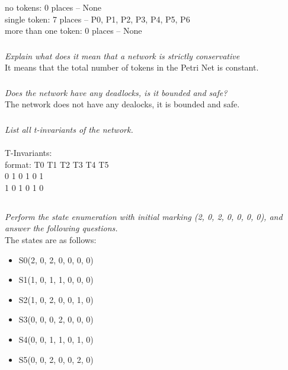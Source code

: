 \documentclass[letterpaper]{article}
\begin{document}
no tokens: 0 places -- None\\
single token: 7 places -- P0, P1, P2, P3, P4, P5, P6\\
more than one token: 0 places -- None\\

\subsubsection{}
\textit{Explain what does it mean that a network is strictly conservative}\\

It means that the total number of tokens in the Petri Net is constant.

\subsubsection{}
\textit{Does the network have any deadlocks, is it bounded and safe?}\\

The network does not have any dealocks, it is bounded and safe.

\subsubsection{}
\textit{List all t-invariants of the network.}\\ \\
T-Invariants: \\
format: T0 T1 T2 T3 T4 T5 \\
0 1 0 1 0 1 \\
1 0 1 0 1 0 \\

\subsection{}
\textit{Perform the state enumeration with initial marking (2, 0, 2, 0, 0, 0, 0), and answer the following questions.}\\

The states are as follows:
\begin{itemize}
 \item S0(2, 0, 2, 0, 0, 0, 0)
 \item S1(1, 0, 1, 1, 0, 0, 0)
 \item S2(1, 0, 2, 0, 0, 1, 0)
 \item S3(0, 0, 0, 2, 0, 0, 0)
 \item S4(0, 0, 1, 1, 0, 1, 0)
 \item S5(0, 0, 2, 0, 0, 2, 0)
\end{itemize}
\end{document}
